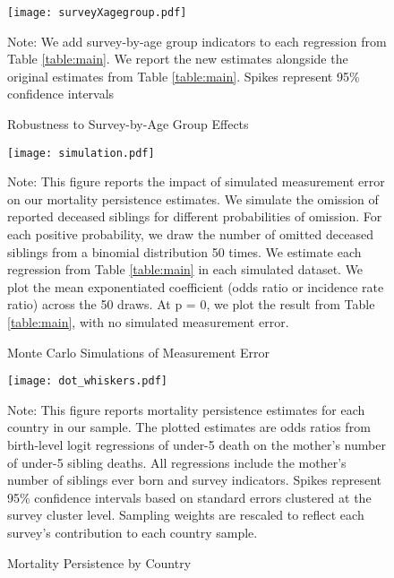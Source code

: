 \documentclass[12pt,english]{article}
\begin{document}
\begin{sidewaysfigure}
    \caption{Robustness to Survey-by-Age Group Effects}
    \label{figure:surveyXagegroup}
    \begin{center}
    \texttt{[image: surveyXagegroup.pdf]}
    \end{center}
\footnotesize{Note: We add survey-by-age group indicators to each regression from Table \ref{table:main}. We report the new estimates alongside the original estimates from Table \ref{table:main}. Spikes represent 95\% confidence intervals}
\end{sidewaysfigure}

\begin{sidewaysfigure}
    \caption{Monte Carlo Simulations of Measurement Error}
   \label{figure:measurement}
  \begin{center}
\texttt{[image: simulation.pdf]}
 \end{center}
\footnotesize{Note: This figure reports the impact of simulated measurement error on our mortality persistence estimates. We simulate the omission of reported deceased siblings for different probabilities of omission. For each positive probability, we draw the number of omitted deceased siblings from a binomial distribution 50 times. We estimate each regression from Table \ref{table:main} in each simulated dataset. We plot the mean exponentiated coefficient (odds ratio or incidence rate ratio) across the 50 draws. At p = 0, we plot the result from Table \ref{table:main}, with no simulated measurement error.}
\end{sidewaysfigure}

\begin{figure}
    \caption{Mortality Persistence by Country}
    \label{figure:countrylevel}
    \begin{center}
    \texttt{[image: dot\_whiskers.pdf]}
    \end{center}
\footnotesize{Note: This figure reports mortality persistence estimates for each country in our sample. The plotted estimates are odds ratios from birth-level logit regressions of under-5 death on the mother's number of under-5 sibling deaths. All regressions include the mother's number of siblings ever born and survey indicators. Spikes represent 95\% confidence intervals based on standard errors clustered at the survey cluster level. Sampling weights are rescaled to reflect each survey's contribution to each country sample.}
\end{figure}
\end{document}
